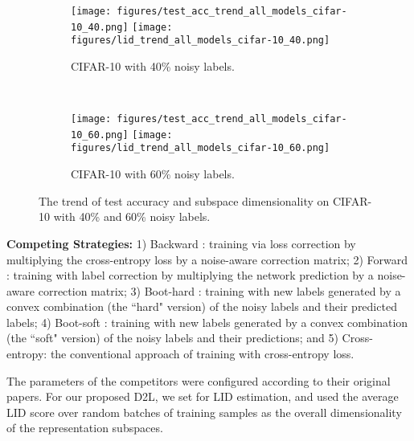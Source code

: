 \documentclass{article}
\begin{document}
\begin{figure}[!tb]
\centering
\begin{subfigure}{.5\textwidth}
  \centering
  \texttt{[image: figures/test\_acc\_trend\_all\_models\_cifar-10\_40.png]}
\texttt{[image: figures/lid\_trend\_all\_models\_cifar-10\_40.png]}
  \caption{CIFAR-10 with 40\% noisy labels.}
  \label{fig:dimensionality_1}
\end{subfigure} \\
\begin{subfigure}{.5\textwidth}
  \centering
  \texttt{[image: figures/test\_acc\_trend\_all\_models\_cifar-10\_60.png]}
\texttt{[image: figures/lid\_trend\_all\_models\_cifar-10\_60.png]}
  \caption{CIFAR-10 with 60\% noisy labels.}
  \label{fig:dimensionality_2}
\end{subfigure}
\caption{The trend of test accuracy and subspace dimensionality on CIFAR-10 with 40\% and 60\% noisy labels.}
\label{fig:dimensionality}
\vspace{-0.2in}
\end{figure}





\textbf{Competing Strategies:}
1) Backward \cite{patrini2017making}: training via loss correction by multiplying the cross-entropy loss by a noise-aware correction matrix; 2) Forward \cite{patrini2017making}: training with label correction by multiplying the network prediction by a noise-aware correction matrix; 3) Boot-hard \cite{reed2014training}: training with new labels generated by a convex combination (the ``hard" version) of the noisy labels and their predicted labels; 4) Boot-soft \cite{reed2014training}: training with new labels generated by a convex combination (the ``soft" version) of the noisy labels and their predictions; and 5) Cross-entropy: the conventional approach of training with cross-entropy loss.



The parameters of the competitors were configured according to their original papers. For our proposed D2L, we set  for LID estimation, and used the average LID score over  random batches of training samples as the overall dimensionality of the representation subspaces.
\end{document}
